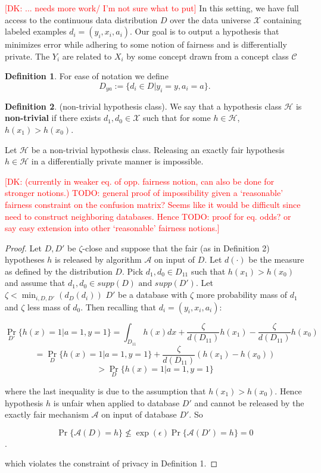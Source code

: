 \documentclass[format = sigconf]{acmart}
\newcommand{\dk}[1]{\textcolor{red}{[DK: #1]}}
\newcommand{\A}{\mathcal{A}}
\renewcommand{\H}{\mathcal{H}}
\newcommand{\C}{\mathcal{C}}
\newcommand{\X}{\mathcal{X}}
\newcommand{\1}{\mathbbm{1}}
\newcommand{\eps}{\epsilon}
\newcommand{\zt}{\zeta}
\theoremstyle{definition}
\newtheorem{defn}{Definition}[section]
\begin{document}
\dk {... needs more work/ I'm not sure what to put}
In this setting, we have full access to the continuous data distribution $D$ over the data universe $\X$ containing labeled examples $d_i = (y_i,x_i,a_i)$. Our goal is to output a hypothesis that minimizes error while adhering to some notion of fairness and is differentially private. The $Y_i$ are related to $X_i$ by some concept drawn from a concept class $\C$




\begin{defn}
	For ease of notation we define
	$$D_{ya} := \{d_i \in D | y_i = y, a_i = a \}.$$
\end{defn}
\begin{defn}
	(non-trivial hypothesis class). We say that a hypothesis class $\H$ is {\bf non-trivial} if there exists $d_1, d_0 \in \mathcal{X}$ such that for some $h \in \H$, $h(x_1) > h(x_0)$.
\end{defn}
\begin{lemma}Let $\mathcal{H}$ be a non-trivial hypothesis class. Releasing an exactly fair hypothesis $h\in \mathcal{H}$ in a differentially private manner is impossible.
\end{lemma}
\dk{ (currently in weaker eq. of opp. fairness notion, can also be done for stronger notions.) TODO: general proof of impossibility given a `reasonable' fairness constraint on the confusion matrix? Seems like it would be difficult since need to construct neighboring databases. Hence TODO: proof for eq. odds? or say easy extension into other `reasonable' fairness notions.}

\begin{proof}
	Let $D, D'$ be $\zt$-close and suppose that the fair (as in Definition 2) hypotheses $h$ is released by algorithm $\mathcal{A}$ on input of $D$. Let $d(\cdot)$ be the measure as defined by the distribution $D$. Pick $d_1, d_0 \in D_{11}$ such that $h(x_1) > h(x_0)$ and assume that $d_1, d_0 \in supp(D) \text{ and } supp(D')$. Let $\zt < \min_{i,D,D'}(d_{D}(d_i))$ $D'$ be a database with $\zt$ more probability mass of $d_1$ and $\zt$ less mass of $d_0$. Then recalling that $d_i = (y_i, x_i, a_i)$:

$$\Pr_{D'}\{h(x) = 1 | a = 1, y=1\} = \int_{D_{11}}h(x)dx + \frac{\zt}{d(D_{11})} h(x_1) - \frac{\zt}{d(D_{11})} h(x_0) $$
$$= \Pr_{D}\{h(x) = 1 | a = 1, y=1\} + \frac{\zt}{d(D_{11})} (h(x_1) - h(x_0))$$
$$>  \Pr_{D}\{h(x) = 1 | a = 1, y=1\}$$

where the last inequality is due to the assumption that $h(x_1) > h(x_0)$. Hence hypothesis $h$ is unfair when applied to database $D'$ and cannot be released by the exactly fair mechanism $\A$ on input of database $D'$. So

$$\Pr\{\mathcal{A}(D) = h\} \not\leq \exp(\eps)\Pr\{\mathcal{A}(D') = h\} = 0$$.

which violates the constraint of privacy in Definition 1.
\end{proof}
\end{document}
